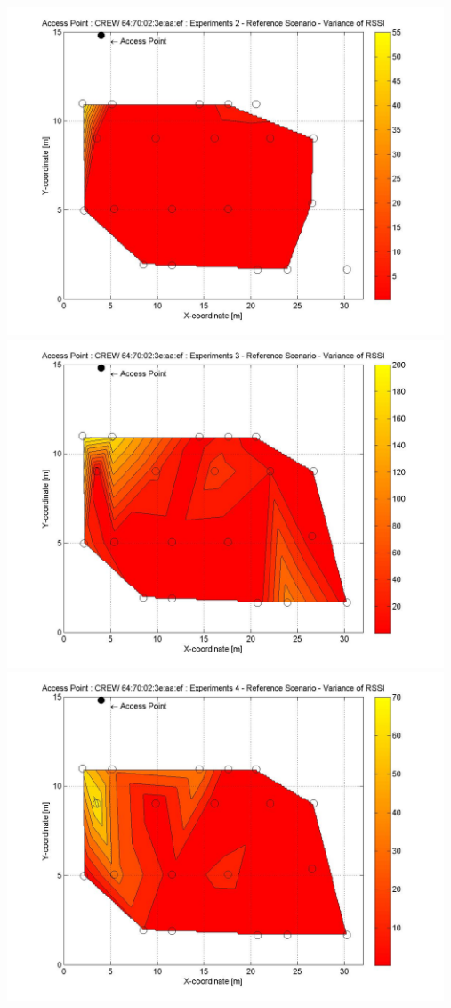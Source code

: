 \documentclass[11pt,a4paper,headinclude,footinclude,chapterprefix=on]{scrreprt}
\begin{document}
\begin{longtable}
	\includegraphics[width=13cm]{../../Source/plot/CREW_ef/ef_Ref_Ex_2_Variance.jpg} \\
	\includegraphics[width=13cm]{../../Source/plot/CREW_ef/ef_Ref_Ex_3_Variance.jpg} \\
	\includegraphics[width=13cm]{../../Source/plot/CREW_ef/ef_Ref_Ex_4_Variance.jpg} 
\end{longtable}
\end{document}
